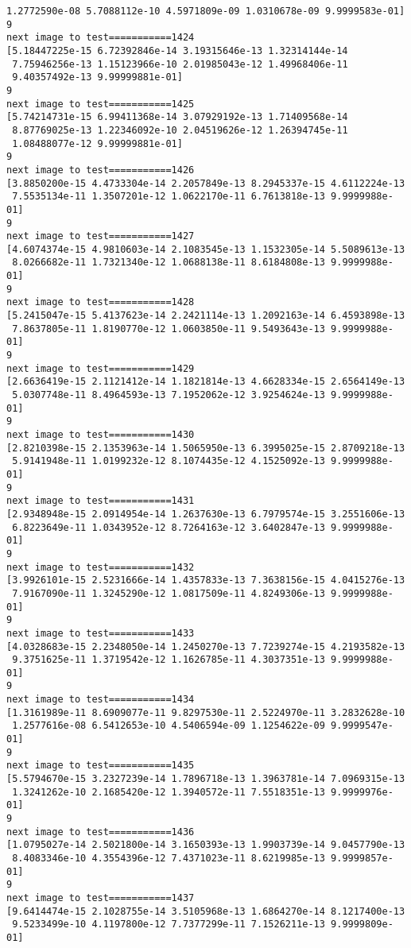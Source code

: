 \documentclass[11pt]{article}
\begin{document}
\begin{Verbatim}[commandchars=\\\{\}]
 1.2772590e-08 5.7088112e-10 4.5971809e-09 1.0310678e-09 9.9999583e-01]
9
next image to test===========1424
[5.18447225e-15 6.72392846e-14 3.19315646e-13 1.32314144e-14
 7.75946256e-13 1.15123966e-10 2.01985043e-12 1.49968406e-11
 9.40357492e-13 9.99999881e-01]
9
next image to test===========1425
[5.74214731e-15 6.99411368e-14 3.07929192e-13 1.71409568e-14
 8.87769025e-13 1.22346092e-10 2.04519626e-12 1.26394745e-11
 1.08488077e-12 9.99999881e-01]
9
next image to test===========1426
[3.8850200e-15 4.4733304e-14 2.2057849e-13 8.2945337e-15 4.6112224e-13
 7.5535134e-11 1.3507201e-12 1.0622170e-11 6.7613818e-13 9.9999988e-01]
9
next image to test===========1427
[4.6074374e-15 4.9810603e-14 2.1083545e-13 1.1532305e-14 5.5089613e-13
 8.0266682e-11 1.7321340e-12 1.0688138e-11 8.6184808e-13 9.9999988e-01]
9
next image to test===========1428
[5.2415047e-15 5.4137623e-14 2.2421114e-13 1.2092163e-14 6.4593898e-13
 7.8637805e-11 1.8190770e-12 1.0603850e-11 9.5493643e-13 9.9999988e-01]
9
next image to test===========1429
[2.6636419e-15 2.1121412e-14 1.1821814e-13 4.6628334e-15 2.6564149e-13
 5.0307748e-11 8.4964593e-13 7.1952062e-12 3.9254624e-13 9.9999988e-01]
9
next image to test===========1430
[2.8210398e-15 2.1353963e-14 1.5065950e-13 6.3995025e-15 2.8709218e-13
 5.9141948e-11 1.0199232e-12 8.1074435e-12 4.1525092e-13 9.9999988e-01]
9
next image to test===========1431
[2.9348948e-15 2.0914954e-14 1.2637630e-13 6.7979574e-15 3.2551606e-13
 6.8223649e-11 1.0343952e-12 8.7264163e-12 3.6402847e-13 9.9999988e-01]
9
next image to test===========1432
[3.9926101e-15 2.5231666e-14 1.4357833e-13 7.3638156e-15 4.0415276e-13
 7.9167090e-11 1.3245290e-12 1.0817509e-11 4.8249306e-13 9.9999988e-01]
9
next image to test===========1433
[4.0328683e-15 2.2348050e-14 1.2450270e-13 7.7239274e-15 4.2193582e-13
 9.3751625e-11 1.3719542e-12 1.1626785e-11 4.3037351e-13 9.9999988e-01]
9
next image to test===========1434
[1.3161989e-11 8.6909077e-11 9.8297530e-11 2.5224970e-11 3.2832628e-10
 1.2577616e-08 6.5412653e-10 4.5406594e-09 1.1254622e-09 9.9999547e-01]
9
next image to test===========1435
[5.5794670e-15 3.2327239e-14 1.7896718e-13 1.3963781e-14 7.0969315e-13
 1.3241262e-10 2.1685420e-12 1.3940572e-11 7.5518351e-13 9.9999976e-01]
9
next image to test===========1436
[1.0795027e-14 2.5021800e-14 3.1650393e-13 1.9903739e-14 9.0457790e-13
 8.4083346e-10 4.3554396e-12 7.4371023e-11 8.6219985e-13 9.9999857e-01]
9
next image to test===========1437
[9.6414474e-15 2.1028755e-14 3.5105968e-13 1.6864270e-14 8.1217400e-13
 9.5233499e-10 4.1197800e-12 7.7377299e-11 7.1526211e-13 9.9999809e-01]

\end{Verbatim}
\end{document}
